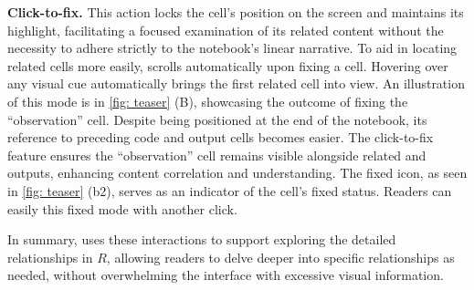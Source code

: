 \textbf{Click-to-fix. }
This action locks the cell's position on the screen and maintains its highlight, facilitating a focused examination of its related content without the necessity to adhere strictly to the notebook's linear narrative.
To aid in locating related cells more easily, \tool scrolls automatically upon fixing a cell. 
Hovering over any visual cue automatically brings the first related cell into view.
An illustration of this mode is in \autoref{fig: teaser} (B), showcasing the outcome of fixing the ``observation'' cell. 
Despite being positioned at the end of the notebook, its reference to preceding code and output cells becomes easier. 
The click-to-fix feature ensures the ``observation'' cell remains visible alongside related  and outputs, enhancing content correlation and {understanding}. 
The fixed icon, as seen in \autoref{fig: teaser} (b2), serves as an indicator of the cell's fixed status.
Readers can easily  this fixed mode with another click.


In summary, \tool uses these interactions to support exploring the detailed relationships in $R$, allowing readers to delve deeper into specific relationships as needed, without overwhelming the interface with excessive visual information. 


 
 








